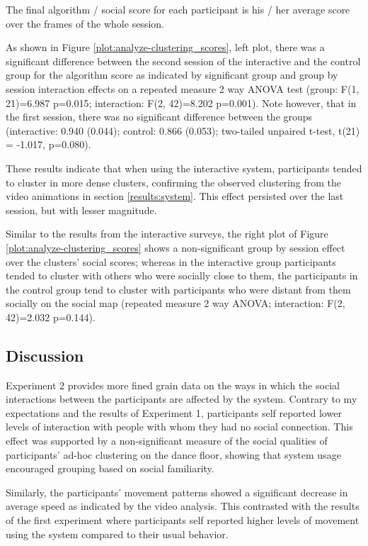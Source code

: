 \documentclass[a4paper,11pt]{article}
\begin{document}
{The final algorithm / social score for each participant is his / her average score over the frames of the whole session.

As shown in Figure \ref{plot:analyze-clustering_scores}, left plot, there was a significant difference between the second session of the interactive and the control group for the algorithm score as indicated by significant group and group by session interaction effects on a repeated measure 2 way ANOVA test (group: F(1, 21)=6.987 p=0.015; interaction: F(2, 42)=8.202 p=0.001).
Note however, that in the first session, there was no significant difference between the groups (interactive: 0.940 (0.044); control: 0.866 (0.053); two-tailed unpaired t-test, t(21) = -1.017, p=0.080).

These results indicate that when using the interactive system, participants tended to cluster in more dense clusters, confirming the observed clustering from the video animations in section \ref{results:system}.
This effect persisted over the last session, but with lesser magnitude.

Similar to the results from the interactive surveys, the right plot of Figure \ref{plot:analyze-clustering_scores} shows a non-significant group by session effect over the clusters' social scores; whereas in the interactive group participants tended to cluster with others who were socially close to them, the participants in the control group tend to cluster with participants who were distant from them socially on the social map (repeated measure 2 way ANOVA; interaction: F(2, 42)=2.032 p=0.144).

\subsection{Discussion}

Experiment 2 provides more fined grain data on the ways in which the social interactions between the participants are affected by the system.
Contrary to my expectations and the results of Experiment 1, participants self reported lower levels of interaction with people with whom they had no social connection.
This effect was supported by a non-significant measure of the social qualities of participants' ad-hoc clustering on the dance floor, showing that system usage encouraged grouping based on social familiarity.

Similarly, the participants' movement patterns showed a significant decrease in average speed as indicated by the video analysis.
This contrasted with the results of the first experiment where participants self reported higher levels of movement using the system compared to their usual behavior.

}
\end{document}
